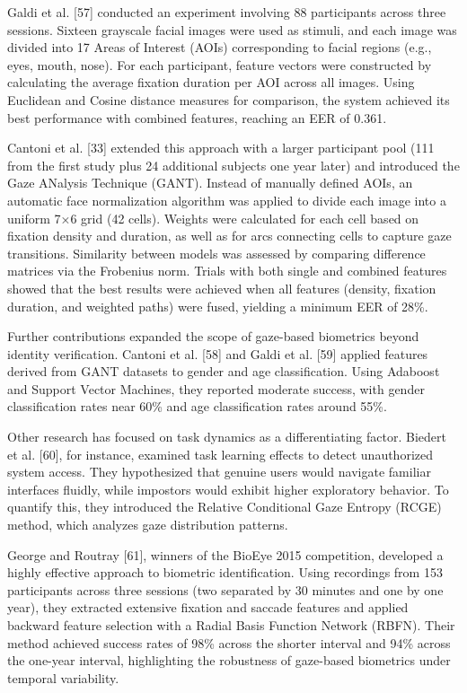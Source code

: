 \documentclass[12pt]{report}
\begin{document}
Galdi et al. [57] conducted an experiment involving 88 participants across three sessions. 
Sixteen grayscale facial images were used as stimuli, and each image was divided into 17 Areas of Interest (AOIs) corresponding to facial regions (e.g., eyes, mouth, nose). 
For each participant, feature vectors were constructed by calculating the average fixation duration per AOI across all images. 
Using Euclidean and Cosine distance measures for comparison, the system achieved its best performance with combined features, reaching an EER of 0.361.

Cantoni et al. [33] extended this approach with a larger participant pool (111 from the first study plus 24 additional subjects one year later) and introduced the Gaze ANalysis Technique (GANT). 
Instead of manually defined AOIs, an automatic face normalization algorithm was applied to divide each image into a uniform 7×6 grid (42 cells).
Weights were calculated for each cell based on fixation density and duration, as well as for arcs connecting cells to capture gaze transitions. 
Similarity between models was assessed by comparing difference matrices via the Frobenius norm. Trials with both single and combined features showed that the best results were achieved when all features (density, fixation duration, and weighted paths) were fused, yielding a minimum EER of 28\%.

Further contributions expanded the scope of gaze-based biometrics beyond identity verification. Cantoni et al. [58] and Galdi et al. [59] applied features derived from GANT datasets to gender and age classification.
Using Adaboost and Support Vector Machines, they reported moderate success, with gender classification rates near 60\% and age classification rates around 55\%.

Other research has focused on task dynamics as a differentiating factor. Biedert et al. [60], for instance, examined task learning effects to detect unauthorized system access. 
They hypothesized that genuine users would navigate familiar interfaces fluidly, while impostors would exhibit higher exploratory behavior. 
To quantify this, they introduced the Relative Conditional Gaze Entropy (RCGE) method, which analyzes gaze distribution patterns.

George and Routray [61], winners of the BioEye 2015 competition, developed a highly effective approach to biometric identification. 
Using recordings from 153 participants across three sessions (two separated by 30 minutes and one by one year), they extracted extensive fixation and saccade features and applied backward feature selection with a Radial Basis Function Network (RBFN). 
Their method achieved success rates of 98\% across the shorter interval and 94\% across the one-year interval, highlighting the robustness of gaze-based biometrics under temporal variability.
\end{document}
